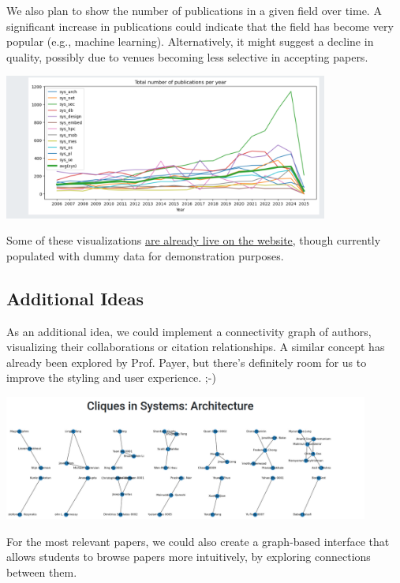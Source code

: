 \documentclass{article}
\begin{document}
We also plan to show the number of publications in a given field over time.
A significant increase in publications could indicate that the field has become very popular (e.g., machine learning).
Alternatively, it might suggest a decline in quality, possibly due to venues becoming less selective in accepting papers.

\begin{center}
\includegraphics[width=0.8\textwidth]{./pictures/number_of_publications.png}
\end{center}

Some of these visualizations \href{https://com-480-data-visualization.github.io/DSM/}{are already live on the website}, though currently populated with dummy data for demonstration purposes.

\subsection{Additional Ideas}
As an additional idea, we could implement a connectivity graph of authors, visualizing their collaborations or citation relationships.
A similar concept has already been explored by Prof. Payer, but there’s definitely room for us to improve the styling and user experience. ;-)

\begin{center}
\includegraphics[width=0.9\textwidth]{./pictures/cliques.png}
\end{center}

For the most relevant papers, we could also create a graph-based interface that allows students to browse papers more intuitively, by exploring connections between them.
\end{document}
